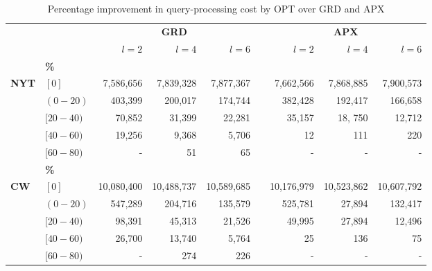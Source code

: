 \begin{table}\centering \footnotesize
\begin{tabular}{@{}llrrrcrrr@{}}\toprule
& & \multicolumn{3}{c}{\textbf{GRD}} & \phantom{abc} & \multicolumn{3}{c}{\textbf{APX}}\\ 
\cmidrule{3-5} \cmidrule{7-9}
& & $l=2$ & $l=4$ & $l=6$ && $l=2$ & $l=4$ & $l=6$\\ \midrule
&\textbf{\%}\\
\textbf{NYT}& $[0]$  & 7,586,656 & 7,839,328 & 7,877,367 && 7,662,566 & 7,868,885 & 7,900,573\\
& $(0-20)$ & 403,399 & 200,017 & 174,744 && 382,428 & 192,417 & 166,658\\
& $[20-40)$ & 70,852 & 31,399 & 22,281 && 35,157& 18, 750 & 12,712\\
& $[40-60)$ &  19,256& 9,368 & 5,706 && 12 & 111& 220\\ 
& $[60-80)$ & - & 51 & 65 && - & - & -\\
\midrule
&\textbf{\%}\\
\textbf{CW}& $[0]$ & 10,080,400 & 10,488,737 & 10,589,685  && 10,176,979 & 10,523,862 & 10,607,792\\
& $(0-20)$ & 547,289 & 204,716 & 135,579 && 525,781 & 27,894 & 132,417\\
& $[20-40)$ & 98,391 & 45,313 & 21,526 && 49,995& 27,894& 12,496\\
& $[40-60)$ & 26,700 & 13,740 & 5,764 && 25 & 136 & 75\\ 
& $[60-80)$ & - & 274 & 226 && - & - & -\\
\bottomrule
\end{tabular}
\caption{Percentage improvement in query-processing cost by OPT over GRD and APX}

\label{tab:optimizers}
\end{table}

